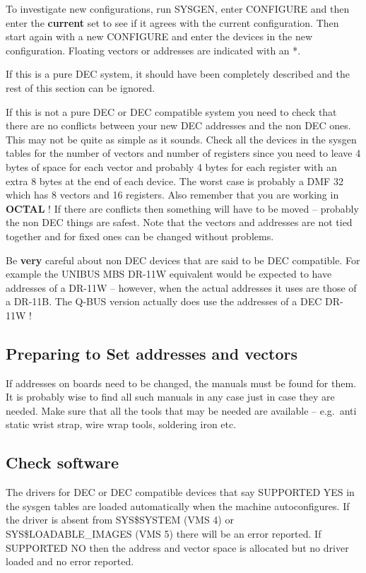 To investigate new configurations, run SYSGEN, enter CONFIGURE and
then enter the {\bf current} set to see if it agrees with the current
configuration.
Then start again with a new CONFIGURE and enter the devices in the new
configuration.
Floating vectors or addresses are indicated with an *.

If this is a pure DEC system, it should have been completely described
and the rest of this section can be ignored.

If this is not a pure DEC or DEC compatible system you need to
check that there are no conflicts between your new DEC addresses and the
non DEC ones.
This may not be quite as simple as it sounds.
Check all the devices in the sysgen tables for the number of vectors and
number of registers since you need to leave 4 bytes of space for each
vector and probably 4 bytes for each register with an extra 8 bytes at
the end of each device.
The worst case is probably a DMF 32 which has 8 vectors and 16
registers.
Also remember that you are working in {\bf OCTAL} !
If there are conflicts then  something will have to be moved -- probably
the non DEC things are safest.
Note that the vectors and addresses are not tied
together and for fixed ones  can be changed without problems.

Be {\bf very} careful about non DEC devices that are said to be
DEC compatible.
For example the UNIBUS MBS DR-11W equivalent would be
expected  to have addresses of a DR-11W -- however, when the actual
addresses it uses are those of a DR-11B.
The Q-BUS version actually does use the addresses of a DEC DR-11W !


\subsection{Preparing to Set addresses and vectors}

If addresses on boards need to be changed, the manuals must be found for them.
It is probably wise to find all such manuals in any case just in
 case they are needed. Make sure that all the tools that may be needed
are available -- e.g.\  anti static wrist strap, wire wrap tools, soldering
iron etc.

\subsection{Check software}

The drivers for DEC or DEC compatible devices that say SUPPORTED YES
 in the sysgen tables are loaded automatically when the machine autoconfigures.
 If the driver is absent from SYS\$SYSTEM (VMS 4) or SYS\$LOADABLE\_IMAGES
(VMS 5) there will be an error reported.
 If SUPPORTED  NO then
 the address and vector space is allocated but no driver loaded and no error
 reported.

